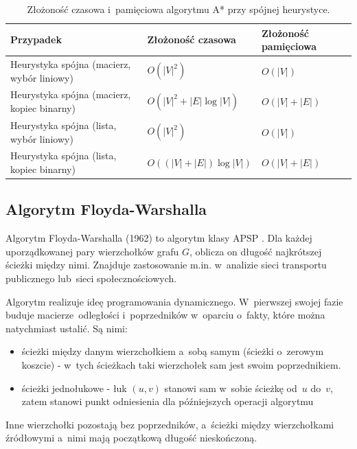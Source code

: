 \documentclass[11pt,a4paper,oneside]{report}
\begin{document}
\begin{table}[H]
  \centering
  \small
  \renewcommand{\arraystretch}{1.25}
  \begin{tabularx}{\textwidth}{@{}l>{\centering\arraybackslash}X>{\centering\arraybackslash}X@{}}
    \toprule
    \textbf{Przypadek} & \textbf{Złożoność czasowa} & \textbf{Złożoność pamięciowa} \\
    \midrule
    Heurystyka spójna (macierz, wybór liniowy) & $O(|V|^2)$ & $O(|V|)$ \\
    Heurystyka spójna (macierz, kopiec binarny) & $O(|V|^2 + |E|\log |V|)$ & $O(|V| + |E|)$ \\
    Heurystyka spójna (lista, wybór liniowy) & $O(|V|^2)$ & $O(|V|)$ \\
    Heurystyka spójna (lista, kopiec binarny) & $O((|V|+|E|)\log |V|)$ & $O(|V| + |E|)$ \\
    \bottomrule
  \end{tabularx}
  \caption{Złożoność czasowa i~pamięciowa algorytmu A* przy spójnej heurystyce.}
  \label{tab:zlozonosc-a-star}
\end{table}

\newpage

\subsection{Algorytm Floyda-Warshalla}

Algorytm Floyda-Warshalla (1962) to algorytm klasy APSP \cite{stanford-2026-bellmanfordfloydwarshall}. Dla każdej uporządkowanej pary wierzchołków grafu $G$, oblicza on długość najkrótszej ścieżki między nimi. Znajduje zastosowanie m.in. w~analizie sieci transportu publicznego lub~sieci społecznościowych.

Algorytm realizuje ideę programowania dynamicznego. W~pierwszej swojej fazie buduje macierze~odległości i~poprzedników w~oparciu o~fakty, które można natychmiast ustalić. Są nimi:
\begin{itemize}
	\item ścieżki między danym wierzchołkiem a~sobą samym (ścieżki o~zerowym koszcie) - w~tych ścieżkach taki wierzchołek sam jest swoim poprzednikiem.
	\item ścieżki jednołukowe - łuk $(u, v)$ stanowi sam w~sobie ścieżkę od~$u$ do~$v$, zatem stanowi punkt odniesienia dla późniejszych operacji algorytmu
\end{itemize}
Inne wierzchołki pozostają bez poprzedników, a~ścieżki między wierzchołkami źródłowymi a~nimi mają początkową długość nieskończoną.
\end{document}

